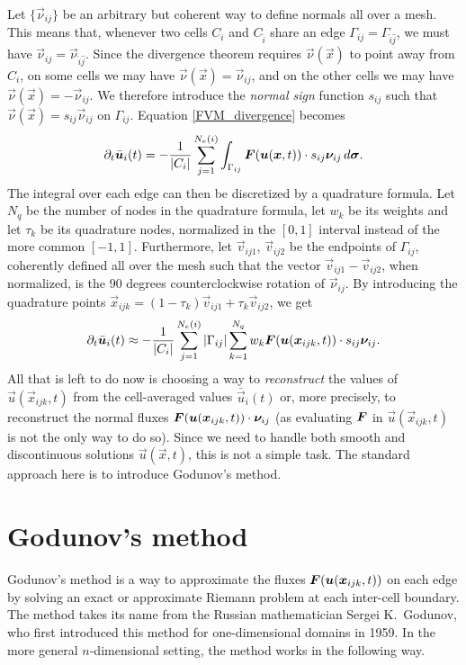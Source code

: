 Let $\{\vec{\nu}_{ij}\}$ be an arbitrary but coherent way to
define normals all over a mesh. This means that, whenever two cells
$C_{i}$ and $C_{\hat{i}}$ share an edge $\Gamma_{ij}=\Gamma_{\hat{i}\hat{j}}$,
we must have $\vec{\nu}_{ij}=\vec{\nu}_{\hat{i}\hat{j}}$.
Since the divergence theorem requires $\vec{\nu}(\vec{x})$ to point away
from $C_{i}$, on some cells we may have $\vec{\nu}(\vec{x}) = \vec{\nu}_{ij}$,
and on the other cells we may have $\vec{\nu}(\vec{x}) = -\vec{\nu}_{ij}$.
We therefore introduce the \emph{normal sign} function $s_{ij}$ such that
$\vec{\nu}(\vec{x}) = s_{ij} \vec{\nu}_{ij}$ on $\Gamma_{ij}$.
Equation \eqref{FVM_divergence} becomes
\[
\partial_{t}\bar{\bm{u}}_{i}(t)
= -\frac{1}{\left|C_{i}\right|} \sum_{j=1}^{N_{e}(i)} \int_{\Gamma_{ij}}
	\bm{F}(\bm{u}(\bm{x},t)) \cdot s_{ij} \bm{\nu}_{ij} \, d\bm{\sigma}.
\]
The integral over each edge can then be discretized by a quadrature
formula. Let $N_q$ be the number of nodes in the quadrature formula,
let $w_{k}$ be its weights and let $\tau_{k}$ be its quadrature nodes,
normalized in the $[0,1]$ interval instead of the more common $[-1,1]$.
Furthermore, let $\vec{v}_{ij1}$, $\vec{v}_{ij2}$ be the endpoints of $\Gamma_{ij}$,
coherently defined all over the mesh such that the vector
$\vec{v}_{ij1}-\vec{v}_{ij2}$, when normalized, is the $90$ degrees
counterclockwise rotation of $\vec{\nu}_{ij}$.
By introducing the quadrature points
$\vec{x}_{ijk} = (1-\tau_{k}) \vec{v}_{ij1} + \tau_{k} \vec{v}_{ij2}$, we get 
\[
\partial_{t}\bar{\bm{u}}_{i}(t)
\approx -\frac{1}{\left|C_{i}\right|}\sum_{j=1}^{N_{e}(i)} \left\lvert\Gamma_{ij}\right\rvert
\sum_{k=1}^{N_{q}} w_{k} \bm{F}(\bm{u}(\bm{x}_{ijk},t)) \cdot s_{ij}\bm{\nu}_{ij}.
\]
All that is left to do now is choosing a way to \emph{reconstruct} the values
of $\vec{u}(\vec{x}_{ijk},t)$ from the cell-averaged values $\bar{\vec{u}}_{i}(t)$
or, more precisely, to reconstruct the normal
fluxes $\bm{F}(\bm{u}(\bm{x}_{ijk},t)) \cdot \bm{\nu}_{ij}$
(as evaluating $\bm{F}$ in $\vec{u}(\vec{x}_{ijk},t)$ is not the only way to do so).
Since we need to handle both smooth and discontinuous solutions
$\vec{u}(\vec{x},t)$, this is not a simple task.
The standard approach here is to introduce Godunov's method.

\section{Godunov's method} \label{sec:godunov-method}
Godunov's method is a way to approximate the fluxes
$\bm{F}(\bm{u}(\bm{x}_{ijk},t))$ on each edge by solving
an exact or approximate Riemann problem at each inter-cell boundary.
The method takes its name from the Russian mathematician Sergei K.\ Godunov,
who first introduced this method for one-dimensional domains in 1959.
In the more general $n$-dimensional setting, the method works in the
following way.

